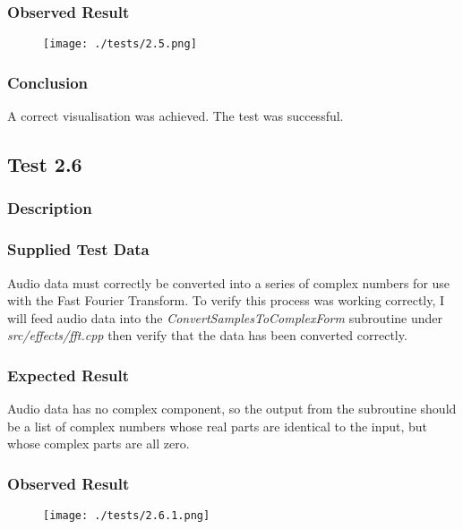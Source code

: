 \subsubsection*{Observed Result}
\label{sec:evidence2.5}
\begin{figure}[H]
	\texttt{[image: ./tests/2.5.png]}
\end{figure}

\subsubsection*{Conclusion}
A correct visualisation was achieved. The test was successful.


\pagebreak
\subsection{Test 2.6}
\subsubsection*{Description}
\paragraph{}
{
	\centering
}

\subsubsection*{Supplied Test Data}
Audio data must correctly be converted into a series of complex numbers for use with the Fast Fourier Transform. To verify this process was working correctly, I will feed audio data into the \textit{ConvertSamplesToComplexForm} subroutine under \textit{src/effects/fft.cpp} then verify that the data has been converted correctly.

\subsubsection*{Expected Result}
Audio data has no complex component, so the output from the subroutine should be a list of complex numbers whose real parts are identical to the input, but whose complex parts are all zero.

\subsubsection*{Observed Result}
\label{sec:evidence2.6}
\begin{figure}[H]
	\texttt{[image: ./tests/2.6.1.png]}
\end{figure}

